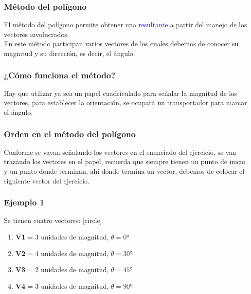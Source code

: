 \documentclass[14pt, xcolor={usenames,dvipsnames}]{beamer}
\begin{document}
\begin{frame}
\frametitle{Método del polígono}
El método del polígono permite obtener una \textcolor{blue}{resultante} a partir del manejo de los vectores involucrados.
\\
\bigskip
\pause
En este método participan varios vectores de los cuales debemos de conocer su magnitud y su dirección, es decir, el ángulo.
\end{frame}
\begin{frame}
\frametitle{¿Cómo funciona el método?}
Hay que utilizar ya sea un papel cuadrículado para señalar la magnitud de los vectores, para establecer la orientación, se ocupará un transportador para marcar el ángulo.
\end{frame}
\begin{frame}
\frametitle{Orden en el método del polígono}
Conforme se vayan señalando los vectores en el enunciado del ejercicio, se van trazando los vectores en el papel, recuerda que siempre tienen un punto de inicio y un punto donde terminan, ahí donde termina un vector, debemos de colocar el siguiente vector del ejercicio.
\end{frame}
\begin{frame}
\frametitle{Ejemplo 1}
Se tienen cuatro vectores:
[circle]
\begin{enumerate}[<+->]
\item \textbf{V1} = 3 unidades de magnitud, $\theta = \ang{0}$
\item \textbf{V2} = 4 unidades de magnitud, $\theta = \ang{30}$
\item \textbf{V3} = 2 unidades de magnitud, $\theta = \ang{45}$
\item \textbf{V4} = 3 unidades de magnitud, $\theta = \ang{90}$
\end{enumerate}
\end{frame}
\end{document}
